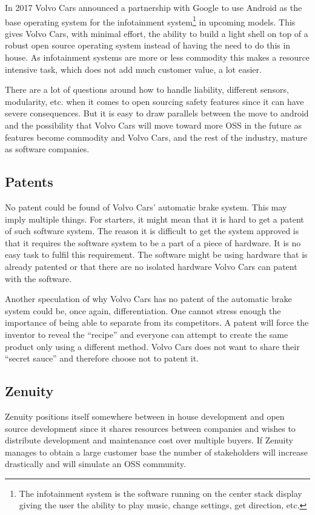 \documentclass[conference]{IEEEtran}
\begin{document}
In 2017 Volvo Cars announced a partnership with Google to use Android as the base operating system for the infotainment system\footnote{The infotainment system is the software running on the center stack display giving the user the ability to play music, change settings, get direction, etc.} in upcoming models. \cite{VolvoAndroid} This gives Volvo Cars, with minimal effort, the ability to build a light shell on top of a robust open source operating system instead of having the need to do this in house. As infotainment systems are more or less commodity this makes a resource intensive task, which does not add much customer value, a lot easier.

There are a lot of questions around how to handle liability, different sensors, modularity, etc. when it comes to open sourcing safety features since it can have severe consequences. But it is easy to draw parallels between the move to android and the possibility that Volvo Cars will move toward more OSS in the future as features become commodity and Volvo Cars, and the rest of the industry, mature as software companies.

\subsection{Patents}
No patent could be found of Volvo Cars' automatic brake system. This may imply multiple things. For starters, it might mean that it is hard to get a patent of such software system. The reason it is difficult to get the system approved is that it requires the software system to be a part of a piece of hardware. It is no easy task to fulfil this requirement. The software might be using hardware that is already patented or that there are no isolated hardware Volvo Cars can patent with the software. 

Another speculation of why Volvo Cars has no patent of the automatic brake system could be, once again, differentiation. One cannot stress enough the importance of being able to separate from its competitors. A patent will force the inventor to reveal the ``recipe'' and everyone can attempt to create the same product only using a different method. Volvo Cars does not want to share their ``secret sauce'' and therefore choose not to patent it. \cite{SoftwarePatent}

\subsection{Zenuity}
Zenuity positions itself somewhere between in house development and open source development since it shares resources between companies and wishes to distribute development and maintenance cost over multiple buyers. If Zenuity manages to obtain a large customer base the number of stakeholders will increase drastically and will simulate an OSS community.
\end{document}
